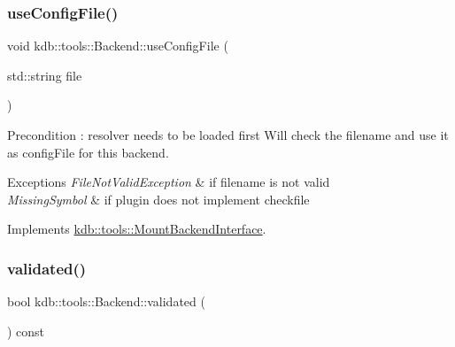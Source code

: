 \mbox{\label{classkdb_1_1tools_1_1Backend_a5c72747e5419d7802849cfc2eb4064d2}} 
\subsubsection{\texorpdfstring{use\+Config\+File()}{useConfigFile()}}
{\footnotesize\ttfamily void kdb\+::tools\+::\+Backend\+::use\+Config\+File (\begin{DoxyParamCaption}\item[{std\+::string}]{file }\end{DoxyParamCaption})\hspace{0.3cm}{\ttfamily [virtual]}}

\begin{DoxyPrecond}{Precondition}
\+: resolver needs to be loaded first Will check the filename and use it as config\+File for this backend. 
\end{DoxyPrecond}

\begin{DoxyExceptions}{Exceptions}
{\em File\+Not\+Valid\+Exception} & if filename is not valid \\
\hline
{\em Missing\+Symbol} & if plugin does not implement \textquotesingle{}checkfile\textquotesingle{} \\
\hline
\end{DoxyExceptions}


Implements \hyperlink{classkdb_1_1tools_1_1MountBackendInterface}{kdb\+::tools\+::\+Mount\+Backend\+Interface}.

\mbox{\label{classkdb_1_1tools_1_1Backend_a7b28929231bc592c1a83f42121405496}} 
\subsubsection{\texorpdfstring{validated()}{validated()}}
{\footnotesize\ttfamily bool kdb\+::tools\+::\+Backend\+::validated (\begin{DoxyParamCaption}{ }\end{DoxyParamCaption}) const\hspace{0.3cm}{\ttfamily [virtual]}}

